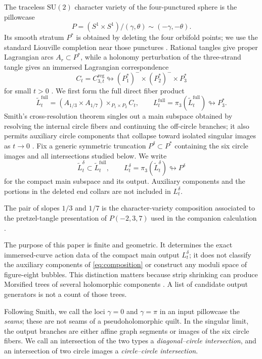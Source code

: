 \documentclass[11pt,reqno]{amsart}
\theoremstyle{plain}
\theoremstyle{definition}
\newcommand{\iss}{\looparrowright}
\begin{document}
The traceless $\mathrm{SU}(2)$ character variety of the four-punctured sphere is the pillowcase
\[
 P=(S^1\times S^1)/(\gamma,\theta)\sim(-\gamma,-\theta).
\]
Its smooth stratum $P^*$ is obtained by deleting the four orbifold points; we use the standard
Liouville completion near those punctures \cite[Appendix~A.1.1]{CHKK}.  Rational tangles give
proper Lagrangian arcs $A_r\subset P^*$, while a holonomy perturbation of the three-strand tangle
gives an immersed Lagrangian correspondence
\[
 C_t=C_{3,t}^{\mathrm{reg}}\iss(P_1^*)^-\times(P_2^*)^-\times P_3^*
\]
for small $t>0$ \cite{HeraldKirk,Smith}.  We first form the full direct fiber product
\begin{equation}\label{eq:composition}
 \widetilde L_t^{\mathrm{full}}=(A_{1/3}\times A_{1/7})
       \times_{P_1\times P_2} C_t,
 \qquad
 L_t^{\mathrm{full}}=\pi_3(\widetilde L_t^{\mathrm{full}})\iss P_3^*.
\end{equation}
Smith's cross-resolution theorem singles out a main subspace obtained by resolving the internal
circle fibers and continuing the off-circle branches; it also permits auxiliary circle components
that collapse toward isolated singular images as $t\to0$ \cite[Thm.~4.22]{Smith}.  Fix a generic
symmetric truncation $P^\delta\subset P^*$ containing the six circle images and all intersections
studied below.  We write
\[
 \widetilde L_t^\delta\subset \widetilde L_t^{\mathrm{full}},
 \qquad
 L_t^\delta=\pi_3(\widetilde L_t^\delta)\iss P^\delta
\]
for the compact main subspace and its output.  Auxiliary components and the portions in the
deleted end collars are not included in $L_t^\delta$.

The pair of slopes $1/3$ and $1/7$ is the character-variety composition associated to the
pretzel-tangle presentation of $P(-2,3,7)$ used in the companion calculation \cite{WuebbenII}.

The purpose of this paper is finite and geometric.  It determines the exact immersed-curve action
data of the compact main output $L_t^\delta$; it does not classify the auxiliary components of
\eqref{eq:composition} or construct any moduli space of figure-eight bubbles.
This distinction matters because strip shrinking can produce Morsified trees of several
holomorphic components \cite{BottmanWehrheim}.  A list of candidate output generators is not a
count of those trees.

Following Smith, we call the loci $\gamma=0$ and $\gamma=\pi$ in an input pillowcase the
\emph{seams}; these are not seams of a pseudoholomorphic quilt.  In the singular limit, the output
branches are either affine graph segments or images of the six circle fibers.  We call an
intersection of the two types a \emph{diagonal--circle intersection}, and an intersection of two
circle images a \emph{circle--circle intersection}.
\end{document}
